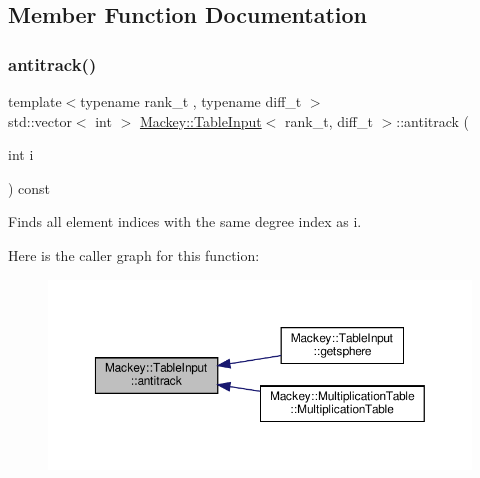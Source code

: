 \subsection{Member Function Documentation}
\mbox{\label{classMackey_1_1TableInput_ae52e7e3ab4605a6ec2d658671db8f896}} 
\subsubsection{\texorpdfstring{antitrack()}{antitrack()}}
{\footnotesize\ttfamily template$<$typename rank\+\_\+t , typename diff\+\_\+t $>$ \\
std\+::vector$<$ int $>$ \hyperlink{classMackey_1_1TableInput}{Mackey\+::\+Table\+Input}$<$ rank\+\_\+t, diff\+\_\+t $>$\+::antitrack (\begin{DoxyParamCaption}\item[{int}]{i }\end{DoxyParamCaption}) const\hspace{0.3cm}{\ttfamily [protected]}}



Finds all element indices with the same degree index as i. 

Here is the caller graph for this function\+:\nopagebreak
\begin{figure}[H]
\begin{center}
\leavevmode
\includegraphics[width=350pt]{classMackey_1_1TableInput_ae52e7e3ab4605a6ec2d658671db8f896_icgraph}
\end{center}
\end{figure}
\mbox{\label{classMackey_1_1TableInput_ace924319da8b66c82214a49277f9e3d3}} 
